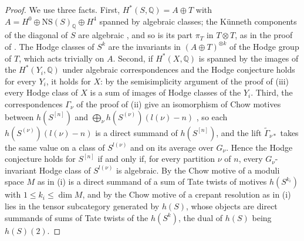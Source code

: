 \documentclass[11pt,reqno]{amsart}
\theoremstyle{plain}
\theoremstyle{definition}
\theoremstyle{remark}
\newcommand{\QQ}{\mathbb{Q}}
\newcommand{\NS}{\mathrm{NS}}
\begin{document}
\begin{proof}
We use three facts. First, $H^{*}(S,\QQ)=A\oplus T$ with
$A=H^{0}\oplus\NS(S)_{\QQ}\oplus H^{4}$ spanned by algebraic classes; the
K\"unneth components of the diagonal of $S$ are algebraic \cite{Mur90}, and
so is its part $\pi_{T}$ in $T\otimes T$, as in the proof of
. The Hodge classes of $S^{k}$ are the invariants in
$(A\oplus T)^{\otimes k}$ of the Hodge group of $T$, which acts trivially on
$A$. Second, if $H^{*}(X,\QQ)$ is spanned by the images of the
$H^{*}(Y_{i},\QQ)$ under algebraic correspondences and the Hodge conjecture
holds for every $Y_{i}$, it holds for $X$: by the semisimplicity argument of
the proof of (iii) every Hodge class of $X$ is a sum of
images of Hodge classes of the $Y_{i}$. Third, the correspondences
$\Gamma_{\nu}$ of the proof of (ii) give an isomorphism
of Chow motives between $h(S^{[n]})$ and
$\bigoplus_{\nu}h(S^{(\nu)})(l(\nu)-n)$ \cite{dCM02}, so each
$h(S^{(\nu)})(l(\nu)-n)$ is a direct summand of $h(S^{[n]})$, and the lift
$\widetilde\Gamma_{\nu*}$ takes the same value on a class of $S^{l(\nu)}$ and
on its average over $G_{\nu}$. Hence the Hodge
conjecture holds for $S^{[n]}$ if and only if, for every partition $\nu$ of
$n$, every $G_{\nu}$-invariant Hodge class of $S^{l(\nu)}$ is algebraic. By
\cite[Theorem~0.1, Remark~2.1]{Bue20} the Chow motive of a moduli space $M$
as in (i) is a direct summand of a sum of Tate twists of motives
$h(S^{k_{i}})$ with $1\le k_{i}\le\dim M$, and by
\cite[Corollary~4.5]{FFZ21} the Chow motive of a crepant resolution as in (i)
lies in the tensor subcategory generated by $h(S)$, whose objects are direct
summands of sums of
Tate twists of the $h(S^{k})$, the dual of $h(S)$ being $h(S)(2)$.


\end{proof}
\end{document}
